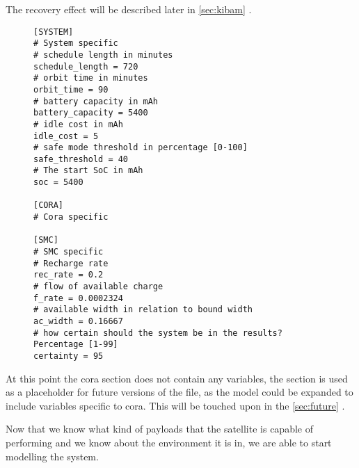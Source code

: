 The recovery effect will be described later in \cref{sec:kibam} .
\begin{figure}[H]
\begin{lstlisting}[caption={An example of how the environment can be defined}, label=lst:ini, language=text]
[SYSTEM]
# System specific
# schedule length in minutes
schedule_length = 720
# orbit time in minutes
orbit_time = 90
# battery capacity in mAh
battery_capacity = 5400
# idle cost in mAh
idle_cost = 5
# safe mode threshold in percentage [0-100]
safe_threshold = 40
# The start SoC in mAh
soc = 5400

[CORA]
# Cora specific

[SMC]
# SMC specific
# Recharge rate
rec_rate = 0.2
# flow of available charge
f_rate = 0.0002324
# available width in relation to bound width
ac_width = 0.16667
# how certain should the system be in the results? Percentage [1-99]
certainty = 95
\end{lstlisting}
\end{figure}
At this point the \gls{cora} section does not contain any variables, the section is used as a placeholder for future versions of the file, as the model could be expanded to include variables specific to \gls{cora}. This will be touched upon in the \cref{sec:future} .



Now that we know what kind of payloads that the satellite is capable of performing and we know about the environment it is in, we are able to start modelling the system.
